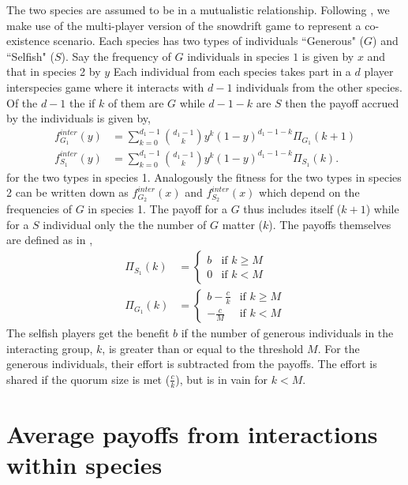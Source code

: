 \documentclass{pnastwo}
\begin{document}
\begin{article}
The two species are assumed to be in a mutualistic relationship.
Following \cite{bergstrom:PNAS:2003,souza:JTB:2009,gokhale:PRSB:2012}, we make use of the multi-player version of the snowdrift game to represent a co-existence scenario.
Each species has two types of individuals ``Generous" ($G$) and ``Selfish" ($S$).
Say the frequency of $G$ individuals in species $1$ is given by $x$ and that in species 2 by $y$
Each individual from each species takes part in a $d$ player interspecies game where it interacts with $d-1$ individuals from the other species.
Of the $d-1$ the if $k$ of them are $G$ while $d-1-k$ are $S$ then the payoff accrued by the individuals is given by,
%
\begin{align}
f^{inter}_{G_1} (y) &= \sum_{k=0}^{d_1 -1} \binom{d_1 -1}{k}y^k (1-y)^{d_1 -1-k} \Pi_{G_1}(k+1) \\
f^{inter}_{S_1} (y) &= \sum_{k=0}^{d_1 -1} \binom{d_1 -1}{k}y^k (1-y)^{d_1 -1-k} \Pi_{S_1}(k).
\label{interfiteqs}
\end{align}
%
for the two types in species 1.
Analogously the fitness for the two types in species 2 can be written down as $f^{inter}_{G_2} (x)$ and $f^{inter}_{S_2} (x)$ which depend on the frequencies of $G$ in species 1.
The payoff for a $G$ thus includes itself ($k+1$) while for a $S$ individual only the the number of $G$ matter ($k$).
The payoffs themselves are defined as in \cite{souza:JTB:2009},
%
\begin{align}
\Pi_{S_1} (k) & = \begin{cases} b & \textrm{if } k \geq M \\ 0 & \textrm{if } k < M \end{cases}
\\
\Pi_{G_1} (k) & = \begin{cases} b-\frac{c}{k} & \textrm{if } k \geq M \\  -\frac{c}{M} & \textrm{if } k < M \end{cases}
\label{eqintergamepayoffs}
\end{align}
%
The selfish players get the benefit $b$ if the number of generous individuals in the interacting group, $k$, is greater than or equal to the threshold $M$.
For the generous individuals, their effort is subtracted from the payoffs.
The effort is shared if the quorum size is met ($\frac{c}{k}$), but is in vain for $k<M$.


\section*{Average payoffs from interactions within species}
\label{appB}


\end{article}
\end{document}
